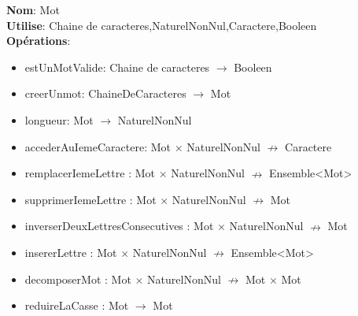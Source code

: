 \documentclass{article}
\begin{document}
    \noindent
    \textbf{Nom}: Mot \\
    \textbf{Utilise}: Chaine de caracteres,NaturelNonNul,Caractere,Booleen \\
    \textbf{Opérations}: \begin{itemize}[label=$\ $, leftmargin=2cm, itemsep=0cm]
        \item estUnMotValide: Chaine de caracteres $\rightarrow $ Booleen
        \item creerUnmot: ChaineDeCaracteres $ \rightarrow$ Mot
        \item longueur: Mot $ \rightarrow$  NaturelNonNul
        \item accederAuIemeCaractere: Mot $ \times $ NaturelNonNul $ \nrightarrow$  Caractere
        \item remplacerIemeLettre : Mot $\times$ NaturelNonNul $\nrightarrow$ Ensemble\textless Mot\textgreater
        \item supprimerIemeLettre : Mot $\times$ NaturelNonNul $\nrightarrow$ Mot
        \item inverserDeuxLettresConsecutives : Mot $\times$ NaturelNonNul $\nrightarrow$ Mot
        \item insererLettre : Mot $\times$ NaturelNonNul $\nrightarrow$ Ensemble\textless Mot\textgreater
        \item decomposerMot : Mot $\times$ NaturelNonNul $\nrightarrow$ Mot $\times$ Mot
        \item reduireLaCasse : Mot $\rightarrow$ Mot
    \end{itemize}
    
\end{document}

